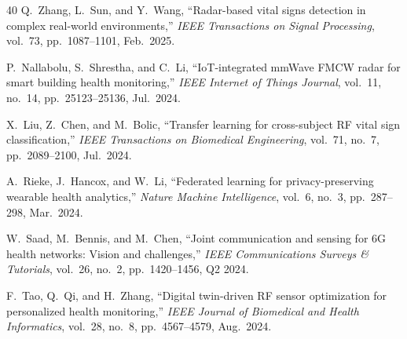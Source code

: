 \documentclass[journal,twoside]{IEEEtran}
\begin{document}
\begin{thebibliography}{40}
Q.~Zhang, L.~Sun, and Y.~Wang, ``Radar-based vital signs detection in complex real-world environments,'' \emph{IEEE Transactions on Signal Processing}, vol.~73, pp.~1087--1101, Feb.\ 2025.

P.~Nallabolu, S.~Shrestha, and C.~Li, ``IoT-integrated mmWave FMCW radar for smart building health monitoring,'' \emph{IEEE Internet of Things Journal}, vol.~11, no.~14, pp.~25123--25136, Jul.\ 2024.

X.~Liu, Z.~Chen, and M.~Bolic, ``Transfer learning for cross-subject RF vital sign classification,'' \emph{IEEE Transactions on Biomedical Engineering}, vol.~71, no.~7, pp.~2089--2100, Jul.\ 2024.

A.~Rieke, J.~Hancox, and W.~Li, ``Federated learning for privacy-preserving wearable health analytics,'' \emph{Nature Machine Intelligence}, vol.~6, no.~3, pp.~287--298, Mar.\ 2024.

W.~Saad, M.~Bennis, and M.~Chen, ``Joint communication and sensing for 6G health networks: Vision and challenges,'' \emph{IEEE Communications Surveys \& Tutorials}, vol.~26, no.~2, pp.~1420--1456, Q2 2024.

F.~Tao, Q.~Qi, and H.~Zhang, ``Digital twin-driven RF sensor optimization for personalized health monitoring,'' \emph{IEEE Journal of Biomedical and Health Informatics}, vol.~28, no.~8, pp.~4567--4579, Aug.\ 2024.

\end{thebibliography}
\end{document}
